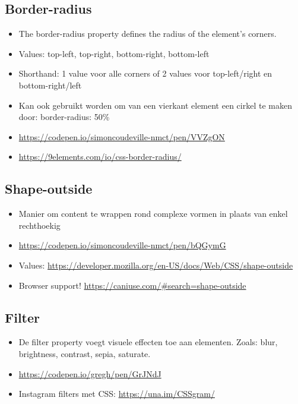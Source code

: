 \documentclass{article}
\begin{document}
\subsection{Border-radius}

\begin{itemize}
    \item The border-radius property defines the radius of the element's corners.
    \item Values: top-left, top-right, bottom-right, bottom-left
    \item Shorthand: 1 value voor alle corners of 2 values voor top-left/right en bottom-right/left
    \item Kan ook gebruikt worden om van een vierkant element een cirkel te maken door: border-radius: 50\%
    \item \url{https://codepen.io/simoncoudeville-nmct/pen/VVZgON}
    \item \url{https://9elements.com/io/css-border-radius/}
\end{itemize}

\subsection{Shape-outside}

\begin{itemize}
    \item Manier om content te wrappen rond complexe vormen in plaats van enkel rechthoekig
    \item \url{https://codepen.io/simoncoudeville-nmct/pen/bQGymG}
    \item Values: \url{https://developer.mozilla.org/en-US/docs/Web/CSS/shape-outside}
    \item Browser support! \url{https://caniuse.com/#search=shape-outside}
\end{itemize}

\subsection{Filter}

\begin{itemize}
    \item De filter property voegt visuele effecten toe aan elementen. Zoals: blur, brightness, contrast, sepia, saturate.
    \item \url{https://codepen.io/gregh/pen/GrJNdJ}
    \item Instagram filters met CSS: \url{https://una.im/CSSgram/}
\end{itemize}
\end{document}
